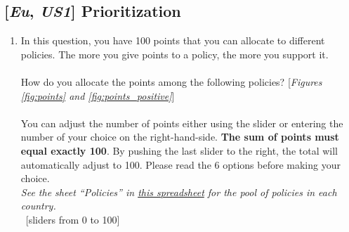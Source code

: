 \subsection*{[\textit{Eu}, \textit{US1}] Prioritization}
\begin{enumerate}[resume] \item \label{q:points} In this question, you have 100 points that you can allocate to different policies. The more you give points to a policy, the more you support it.\\ 
   \\
    How do you allocate the points among the following policies? [\textit{Figures \ref{fig:points} and \ref{fig:points_positive}}]  \\
    \\
    You can adjust the number of points either using the slider or entering the number of your choice on the right-hand-side. \textbf{The sum of points must equal exactly 100}. By pushing the last slider to the right, the total will automatically adjust to 100. Please read the 6 options before making your choice.
    \\ \textit{See the sheet ``Policies'' in \href{https://github.com/bixiou/international_attitudes_toward_global_policies/raw/main/questionnaire/specificities.xlsx}{this spreadsheet} for the pool of policies in each country.}
\\ ~[sliders from 0 to 100]
\end{enumerate}

